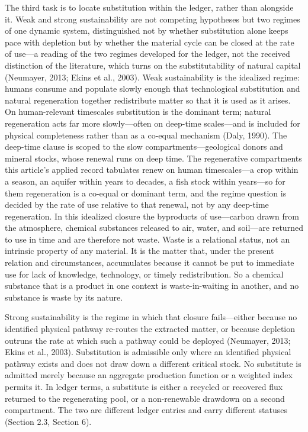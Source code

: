 \documentclass[11pt]{article}
\begin{document}
The third task is to locate substitution within the ledger, rather than
alongside it. Weak and strong sustainability are not competing
hypotheses but two regimes of one dynamic system, distinguished not by
whether substitution alone keeps pace with depletion but by whether the
material cycle can be closed at the rate of use---a reading of the two
regimes developed for the ledger, not the received distinction of the
literature, which turns on the substitutability of natural capital
(Neumayer, 2013; Ekins et al., 2003). Weak sustainability is the
idealized regime: humans consume and populate slowly enough that
technological substitution and natural regeneration together
redistribute matter so that it is used as it arises. On human-relevant
timescales substitution is the dominant term; natural regeneration acts
far more slowly---often on deep-time scales---and is included for
physical completeness rather than as a co-equal mechanism (Daly, 1990).
The deep-time clause is scoped to the slow compartments---geological
donors and mineral stocks, whose renewal runs on deep time. The
regenerative compartments this article's applied record tabulates renew
on human timescales---a crop within a season, an aquifer within years
to decades, a fish stock within years---so for them regeneration is a
co-equal or dominant term, and the regime question is decided by the
rate of use relative to that renewal, not by any deep-time regeneration.
In this idealized closure the byproducts of use---carbon drawn from
the atmosphere, chemical substances released to air, water, and soil---are returned to use in time and are therefore not waste. Waste is a
relational status, not an intrinsic property of any material. It is the
matter that, under the present relation and circumstances, accumulates
because it cannot be put to immediate use for lack of knowledge,
technology, or timely redistribution. So a chemical substance that is a
product in one context is waste-in-waiting in another, and no substance
is waste by its nature.

Strong sustainability is the regime in which that closure fails---either because no identified physical pathway re-routes the extracted
matter, or because depletion outruns the rate at which such a pathway
could be deployed (Neumayer, 2013; Ekins et al., 2003). Substitution is
admissible only where an identified physical pathway exists and does not
draw down a different critical stock. No substitute is admitted merely
because an aggregate production function or a weighted index permits it.
In ledger terms, a substitute is either a recycled or recovered flux
returned to the regenerating pool, or a non-renewable drawdown on a
second compartment. The two are different ledger entries and carry
different statuses (Section 2.3, Section 6).
\end{document}
